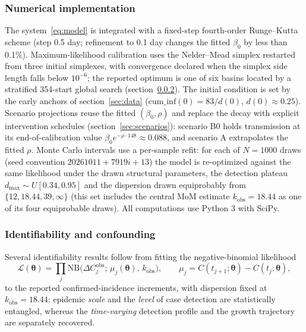 \documentclass[preprint,12pt,numbers]{elsarticle}
\begin{document}
\subsubsection{Numerical implementation}\label{sec:numerics}

The system~\eqref{eq:model} is integrated with a fixed-step fourth-order
Runge--Kutta scheme (step 0.5 day; refinement to 0.1 day changes the
fitted $\beta_0$ by less than 0.1\%). Maximum-likelihood calibration uses
the Nelder--Mead simplex restarted from three initial simplexes, with
convergence declared when the simplex side length falls below $10^{-6}$;
the reported optimum is one of six basins located by a stratified
354-start global search (section~\ref{sec:ident}).
The initial condition is set by the early anchors of section~\ref{sec:data}
($\mathrm{cum\_inf}(0)=83/d(0)$, $d(0)\approx0.25$). Scenario projections
reuse the fitted $(\beta_0,\rho)$ and replace the decay with explicit
intervention schedules (section~\ref{sec:scenarios}): scenario B0 holds
transmission at its end-of-calibration value $\beta_0e^{-\rho\cdot148}\approx0.088$,
and scenario A extrapolates the fitted $\rho$. Monte Carlo intervals use
a per-sample refit: for each of $N=1000$ draws (seed convention
$20261011+7919i+13$) the model is re-optimized against the same
likelihood under the drawn structural parameters, the detection plateau
$d_{\max}\sim U[0.34,0.95]$ and the dispersion drawn equiprobably from
$\{12,18.44,39,\infty\}$ (this set includes the central MoM estimate
$k_{\mathrm{obs}}=18.44$ as one of its four equiprobable draws). All computations use
Python 3 with SciPy.
\subsubsection{Identifiability and confounding}\label{sec:ident}

Several identifiability results follow from fitting the negative-binomial
likelihood
\begin{equation}
\mathcal{L}(\boldsymbol{\theta})
= \prod_{j}\mathrm{NB}\!\big(\Delta C^{\mathrm{obs}}_{j};\,
\mu_{j}(\boldsymbol{\theta}),\,k_{\mathrm{obs}}\big),
\qquad
\mu_{j}=C(t_{j+1};\boldsymbol{\theta})-C(t_{j};\boldsymbol{\theta}),
\label{eq:ident-lik}
\end{equation}
to the reported confirmed-incidence increments, with dispersion fixed at
$k_{\mathrm{obs}}=18.44$: epidemic \emph{scale} and the \emph{level} of case
detection are statistically entangled, whereas the \emph{time-varying}
detection profile and the growth trajectory are separately recovered.
\end{document}
